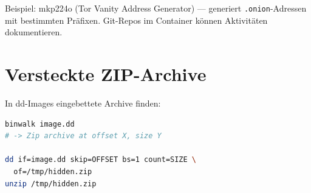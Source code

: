 Beispiel: mkp224o (Tor Vanity Address Generator) — generiert \texttt{.onion}-Adressen mit bestimmten Präfixen.
Git-Repos im Container können Aktivitäten dokumentieren.

\section{Versteckte ZIP-Archive}

In dd-Images eingebettete Archive finden:

\begin{lstlisting}[language=bash]
binwalk image.dd
# -> Zip archive at offset X, size Y

dd if=image.dd skip=OFFSET bs=1 count=SIZE \
  of=/tmp/hidden.zip
unzip /tmp/hidden.zip
\end{lstlisting}
